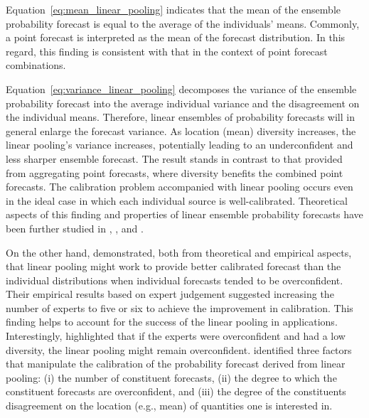 \documentclass[11pt]{article}
\begin{document}
Equation~\eqref{eq:mean_linear_pooling} indicates that the mean of the ensemble probability forecast is equal to the average of the individuals' means. Commonly, a point forecast is interpreted as the mean of the forecast distribution. In this regard, this finding is consistent with that in the context of point forecast combinations.

Equation~\eqref{eq:variance_linear_pooling} decomposes the variance of the ensemble probability forecast into the average individual variance and the disagreement on the individual means. Therefore, linear ensembles of probability forecasts will in general enlarge the forecast variance. As location (mean) diversity increases, the linear pooling's variance increases, potentially leading to an underconfident and less sharper ensemble forecast. The result stands in contrast to that provided from aggregating point forecasts, where diversity benefits the combined point forecasts. The calibration problem accompanied with linear pooling occurs even in the ideal case in which each individual source is well-calibrated. Theoretical aspects of this finding and properties of linear ensemble probability forecasts have been further studied in \cite{Hora2004-fz}, \cite{Ranjan2010-jl}, and \cite{Lichtendahl2013-rt}.

On the other hand, \cite{Hora2004-fz} demonstrated, both from theoretical and empirical aspects, that linear pooling might work to provide better calibrated forecast than the individual distributions when individual forecasts tended to be overconfident. Their empirical results based on expert judgement suggested increasing the number of experts to five or six to achieve the improvement in calibration. This finding helps to account for the success of the linear pooling in applications. Interestingly, \cite{Jose2014-uh} highlighted that if the experts were overconfident and had a low diversity, the linear pooling might remain overconfident. \cite{Lichtendahl2013-rt} identified three factors that manipulate the calibration of the probability forecast derived from linear pooling: (i) the number of constituent forecasts, (ii) the degree to which the constituent forecasts are overconfident, and (iii) the degree of the constituents disagreement on the location (e.g., mean) of quantities one is interested in.
\end{document}

